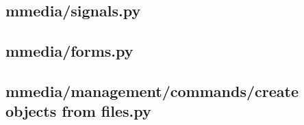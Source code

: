 \subsection{mmedia/signals.py}


\subsection{mmedia/forms.py}


\subsection{mmedia/management/commands/create objects from files.py}

